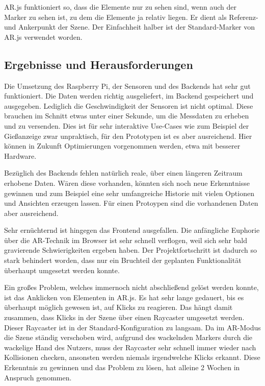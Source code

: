 AR.js funktioniert so, dass die Elemente nur zu sehen sind, wenn auch
der Marker zu sehen ist, zu dem die Elemente ja relativ liegen. Er dient
als Referenz- und Ankerpunkt der Szene. Der Einfachheit halber ist der
Standard-Marker von AR.js verwendet worden.

\hypertarget{ergebnisse-und-herausforderungen}{%
\subsection{Ergebnisse und
Herausforderungen}\label{ergebnisse-und-herausforderungen}}

Die Umsetzung des Raspberry Pi, der Sensoren und des Backends hat sehr
gut funktioniert. Die Daten werden richtig ausgeliefert, im Backend
gespeichert und ausgegeben. Lediglich die Geschwindigkeit der Sensoren
ist nicht optimal. Diese brauchen im Schnitt etwas unter einer Sekunde,
um die Messdaten zu erheben und zu versenden. Dies ist für sehr
interaktive Use-Cases wie zum Beispiel der Gießanzeige zwar unpraktisch,
für den Prototypen ist es aber ausreichend. Hier können in Zukunft
Optimierungen vorgenommen werden, etwa mit besserer Hardware.

Bezüglich des Backends fehlen natürlich reale, über einen längeren
Zeitraum erhobene Daten. Wären diese vorhanden, könnten sich noch neue
Erkenntnisse gewinnen und zum Beispiel eine sehr umfangreiche Historie
mit vielen Optionen und Ansichten erzeugen lassen. Für einen Protoypen
sind die vorhandenen Daten aber ausreichend.

Sehr ernüchternd ist hingegen das Frontend ausgefallen. Die anfängliche
Euphorie über die AR-Technik im Browser ist sehr schnell verflogen, weil
sich sehr bald gravierende Schwierigkeiten ergeben haben. Der
Projektfortschritt ist dadurch so stark behindert worden, dass nur ein
Bruchteil der geplanten Funktionalität überhaupt umgesetzt werden
konnte.

Ein großes Problem, welches immernoch nicht abschließend gelöst werden
konnte, ist das Anklicken von Elementen in AR.js. Es hat sehr lange
gedauert, bis es überhaupt möglich gewesen ist, auf Klicks zu reagieren.
Das hängt damit zusammen, dass Klicks in der Szene über einen Raycaster
umgesetzt werden. Dieser Raycaster ist in der Standard-Konfiguration zu
langsam. Da im AR-Modus die Szene ständig verschoben wird, aufgrund des
wackelnden Markers durch die wackelige Hand des Nutzers, muss der
Raycaster sehr schnell immer wieder nach Kollisionen checken, ansonsten
werden niemals irgendwelche Klicks erkannt. Diese Erkenntnis zu gewinnen
und das Problem zu lösen, hat alleine 2 Wochen in Anspruch genommen.

